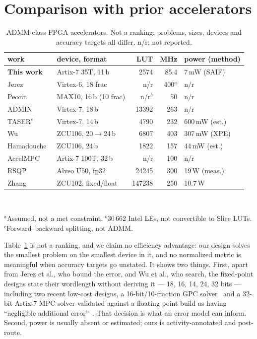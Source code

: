 \documentclass[conference]{IEEEtran}
\begin{document}
\section{Comparison with prior accelerators}
\label{sec:compare}

\begin{table}[t]
\centering\scriptsize\setlength{\tabcolsep}{2.6pt}
\caption{ADMM-class FPGA accelerators. Not a ranking: problems, sizes,
devices and accuracy targets all differ. n/r: not reported.}
\label{tab:compare}
\begin{tabular}{llrrl}
\toprule
work & device, format & LUT & MHz & power (method) \\
\midrule
\textbf{This work} & Artix-7 35T, 11\,b & 2574 & 85.4 & 7\,mW (SAIF) \\
Jerez~\cite{jerez2014mpc} & Virtex-6, 18 frac & n/r & 400$^a$ & n/r \\
Peccin~\cite{peccin2020gpc} & MAX10, 16\,b (10 frac) & n/r$^b$ & 50 & n/r \\
ADMIN~\cite{shahabuddin2021admin} & Virtex-7, 18\,b & 13392 & 263 & n/r \\
TASER$^c$~\cite{castaneda2016taser} & Virtex-7, 14\,b & 4790 & 232 & 600\,mW (est.) \\
Wu~\cite{wu2022mixed} & ZCU106, 20$\to$24\,b & 6807 & 403 & 307\,mW (XPE) \\
Hamadouche~\cite{hamadouche2023lowpower} & ZCU106, 24\,b & 1822 & 157 & 44\,mW (est.) \\
AccelMPC~\cite{grillo2026accelmpc} & Artix-7 100T, 32\,b & n/r & 100 & n/r \\
RSQP~\cite{wang2023rsqp} & Alveo U50, fp32 & 24245 & 300 & 19\,W (meas.) \\
Zhang~\cite{zhang2025pathplanning} & ZCU102, fixed/float & 147238 & 250 & 10.7\,W \\
\bottomrule
\end{tabular}\\[2pt]
\raggedright\scriptsize $^a$Assumed, not a met constraint. $^b$30\,662
Intel LEs, not convertible to Slice LUTs. $^c$Forward--backward splitting, not
ADMM.
\end{table}

Table~\ref{tab:compare} is not a ranking, and we claim no efficiency advantage:
our design solves the smallest problem on the smallest device in it, and no
normalized metric is meaningful when accuracy targets go unstated. It shows
two things. First, apart from Jerez et al., who bound the error, and Wu et al.,
who search, the fixed-point designs state their wordlength without deriving
it --- 18, 16, 14, 24, 32 bits --- including two recent low-cost designs, a 16-bit/10-fraction GPC solver~\cite{peccin2020gpc} and a 32-bit
Artix-7 MPC solver validated against a floating-point build as having
``negligible additional error''~\cite{grillo2026accelmpc}. That decision is
what an error model can inform. Second, power is usually absent or estimated; ours
is activity-annotated and post-route.
\end{document}
